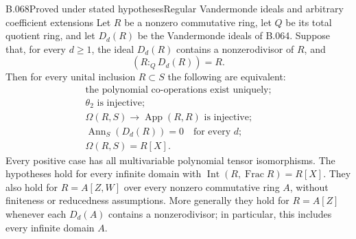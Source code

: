 \begin{saresult}{B.068}{Proved under stated hypotheses}{Regular Vandermonde ideals and arbitrary coefficient extensions}
Let $R$ be a nonzero commutative ring, let $Q$ be its total quotient ring,
and let $D_d(R)$ be the Vandermonde ideals of B.064. Suppose that, for every
$d\ge1$, the ideal $D_d(R)$ contains a nonzerodivisor of $R$, and
\[
                         (R:_Q D_d(R))=R.                 \tag{B68.1}
\]
Then for every unital inclusion $R\subset S$ the following are equivalent:
\[
\begin{gathered}
 \text{the polynomial co-operations exist uniquely};\\
 \theta_2\text{ is injective};\\
 \Omega(R,S)\longrightarrow\operatorname{App}(R,R)
       \text{ is injective};\\
 \operatorname{Ann}_S(D_d(R))=0\quad\text{for every }d;\\
 \Omega(R,S)=R[X].                                         \tag{B68.2}
\end{gathered}
\]
Every positive case has all multivariable polynomial tensor isomorphisms.
The hypotheses hold for every infinite domain with
$\operatorname{Int}(R,\operatorname{Frac}R)=R[X]$.
They also hold for $R=A[Z,W]$ over every nonzero commutative ring $A$,
without finiteness or reducedness assumptions. More generally they hold
for $R=A[Z]$ whenever each $D_d(A)$ contains a nonzerodivisor; in particular,
this includes every infinite domain $A$.
\end{saresult}
